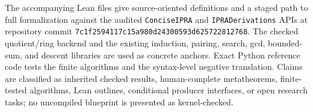 The accompanying Lean files give source-oriented definitions and a staged path to full formalization against the audited \texttt{ConciseIPRA} and \texttt{IPRADerivations} APIs at repository commit \texttt{7c1f2594117c15a980d24300593d625722812768}.  The checked quotient/ring backend and the existing induction, pairing, search, gcd, bounded-sum, and descent libraries are used as concrete anchors.  Exact Python reference code tests the finite algorithms and the syntax-level negative translation.  Claims are classified as inherited checked results, human-complete metatheorems, finite-tested algorithms, Lean outlines, conditional producer interfaces, or open research tasks; no uncompiled blueprint is presented as kernel-checked.
